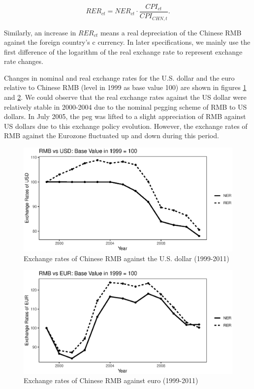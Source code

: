 \documentclass[12pt]{article}
\begin{document}
$$
RER_{ct}=NER_{ct} \cdot \frac{CPI_{ct}}{CPI_{CHN,t}}.
$$

Similarly, an increase in $RER_{ct}$ means a real depreciation of the Chinese RMB against the foreign country's c currency. In later specifications, we mainly use the first difference of the logarithm of the real exchange rate to represent exchange rate changes.

Changes in nominal and real exchange rates for the U.S. dollar and the euro relative to Chinese RMB (level in 1999 as base value 100) are shown in figures \ref{fig.USD} and \ref{fig.EUR}. We could observe that the real exchange rates against the US dollar were relatively stable in 2000-2004 due to the nominal pegging scheme of RMB to US dollars. In July 2005, the peg was lifted to a slight appreciation of RMB against US dollars due to this exchange policy evolution. However, the exchange rates of RMB against the Eurozone fluctuated up and down during this period. 

\begin{figure}[htbp]
	\centering
	\includegraphics[width=1\textwidth]{R/USD.eps}
	\caption{Exchange rates of Chinese RMB against the U.S. dollar (1999-2011)}
	\label{fig.USD}
\end{figure}

\begin{figure}[htbp]
	\centering
	\includegraphics[width=1\textwidth]{R/EUR.eps}
	\caption{Exchange rates of Chinese RMB against euro (1999-2011)}
	\label{fig.EUR}
\end{figure}
\end{document}
